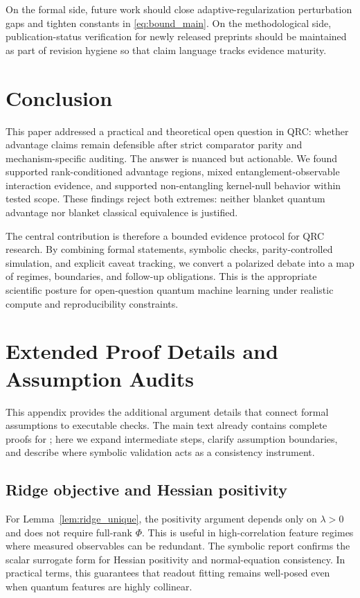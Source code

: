 On the formal side, future work should close adaptive-regularization perturbation gaps and tighten constants in \eqref{eq:bound_main}. On the methodological side, publication-status verification for newly released preprints should be maintained as part of revision hygiene so that claim language tracks evidence maturity.

\section{Conclusion}\label{sec:conclusion}
This paper addressed a practical and theoretical open question in QRC: whether advantage claims remain defensible after strict comparator parity and mechanism-specific auditing. The answer is nuanced but actionable. We found supported rank-conditioned advantage regions, mixed entanglement-observable interaction evidence, and supported non-entangling kernel-null behavior within tested scope. These findings reject both extremes: neither blanket quantum advantage nor blanket classical equivalence is justified.

The central contribution is therefore a bounded evidence protocol for QRC research. By combining formal statements, symbolic checks, parity-controlled simulation, and explicit caveat tracking, we convert a polarized debate into a map of regimes, boundaries, and follow-up obligations. This is the appropriate scientific posture for open-question quantum machine learning under realistic compute and reproducibility constraints.

\clearpage{}\label{sec:end_of_main}






\appendix
\clearpage{}\label{sec:appendix_start}

\section{Extended Proof Details and Assumption Audits}\label{app:proofs}
This appendix provides the additional argument details that connect formal assumptions to executable checks. The main text already contains complete proofs for ; here we expand intermediate steps, clarify assumption boundaries, and describe where symbolic validation acts as a consistency instrument.

\subsection{Ridge objective and Hessian positivity}
For Lemma~\ref{lem:ridge_unique}, the positivity argument depends only on $\lambda>0$ and does not require full-rank $\Phi$. This is useful in high-correlation feature regimes where measured observables can be redundant. The symbolic report confirms the scalar surrogate form for Hessian positivity and normal-equation consistency. In practical terms, this guarantees that readout fitting remains well-posed even when quantum features are highly collinear.

